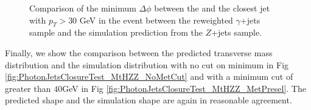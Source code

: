 \begin{figure}[!htbp]
\begin{center}
\caption{Comparison of the minimum $\Delta\phi$ between the \met and the closest jet with $p_{T}>30$ GeV
in the event between the reweighted $\gamma$+jets sample and the 
simulation prediction from the $Z$+jets sample.}
\label{fig:PhotonJetsClosureTest_DPhi}
\end{center}
\end{figure}


Finally, we show the comparison between the predicted transverse mass distribution and the simulation
distribution with no cut on minimum \met in Fig \ref{fig:PhotonJetsClosureTest_MtHZZ_NoMetCut} and 
with a minimum \met cut of greater than $40$GeV in Fig \ref{fig:PhotonJetsClosureTest_MtHZZ_MetPresel}. 
The predicted shape and the simulation shape are again in reasonable agreement. 

